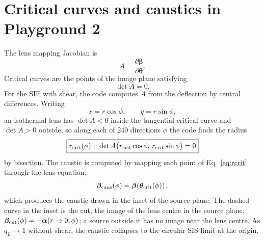 \documentclass[11pt,a4paper]{article}
\newcommand{\be}{\boldsymbol{\beta}}
\newcommand{\thv}{\boldsymbol{\theta}}
\newcommand{\al}{\boldsymbol{\alpha}}
\begin{document}
\section{Critical curves and caustics in Playground 2}
The lens mapping Jacobian is
\begin{equation}
 A=\frac{\partial\be}{\partial\thv}.
\end{equation}
Critical curves are the points of the image plane satisfying
\begin{equation}
 \boxed{\det A=0}.
\end{equation}
For the SIE with shear, the code computes $A$ from the deflection by central differences. Writing
\begin{equation}
 x=r\cos\phi,\qquad y=r\sin\phi,
\end{equation}
an isothermal lens has $\det A<0$ inside the tangential critical curve and $\det A>0$ outside, so along each of 240 directions $\phi$ the code finds the radius
\begin{equation}
 \boxed{r_{\rm crit}(\phi):\ \det A\big(r_{\rm crit}\cos\phi,\,r_{\rm crit}\sin\phi\big)=0}
 \label{eq:rcrit}
\end{equation}
by bisection. The caustic is computed by mapping each point of Eq.~\eqref{eq:rcrit} through the lens equation,
\begin{equation}
 \be_{\rm caus}(\phi)=\be\!\left(\thv_{\rm crit}(\phi)\right),
\end{equation}
which produces the caustic drawn in the inset of the source plane. The dashed curve in the inset is the cut, the image of the lens centre in the source plane, $\be_{\rm cut}(\phi)=-\al(r\rightarrow0,\phi)$; a source outside it has no image near the lens centre. As $q_L\rightarrow1$ without shear, the caustic collapses to the circular SIS limit at the origin.
\end{document}
